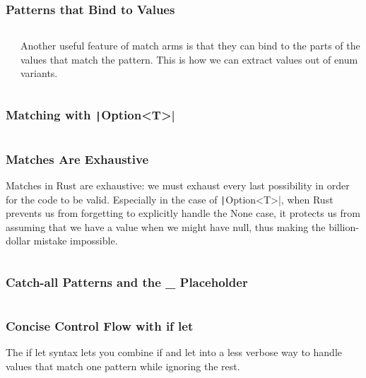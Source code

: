 \documentclass{beamer}
\begin{document}
\begin{frame}[fragile]
	\frametitle{Patterns that Bind to Values}
	\begin{columns}
		\inputminted[fontsize=\scriptsize]{rust}{./code/match2.rs}
		Another useful feature of match arms is that they can bind to the parts of the values that match the pattern. This is how we can extract values out of enum variants.
	\end{columns}
\end{frame}

\begin{frame}[fragile]
	\frametitle{Matching with \texttt|Option<T>| }
	\inputminted{rust}{./code/match3.rs}
\end{frame}

\begin{frame}[fragile]
	\frametitle{Matches Are Exhaustive }
	Matches in Rust are exhaustive: we must exhaust every last possibility in order for the code to be valid. Especially in the case of \texttt|Option<T>|, when Rust prevents us from forgetting to explicitly handle the None case, it protects us from assuming that we have a value when we might have null, thus making the billion-dollar mistake impossible.
	\inputminted{rust}{./code/match4.rs}
\end{frame}


\begin{frame}[fragile]
	\frametitle{Catch-all Patterns and the \_ Placeholder}
	\inputminted{rust}{./code/match5.rs}
\end{frame}


\begin{frame}[fragile]
	\frametitle{Concise Control Flow with if let}
	The if let syntax lets you combine if and let into a less verbose way to handle values that match one pattern while ignoring the rest.
	\inputminted{rust}{./code/match6.rs}
\end{frame}
\end{document}
